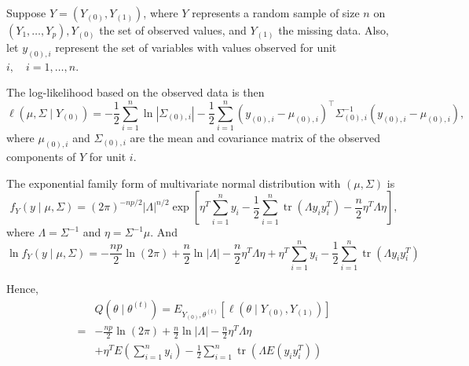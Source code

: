 \begin{example}
	Suppose $Y=\left(Y_{(0)}, Y_{(1)}\right)$, where $Y$ represents a random sample of size $n$ on $\left(Y_{1}, \ldots, Y_{p}\right), Y_{(0)}$ the set of observed values, and $Y_{(1)}$ the missing data. Also, let $y_{(0), i}$ represent the set of variables with values observed for unit $i, \quad i=1, \ldots, n$.

	The log-likelihood based on the observed data is then
	\begin{equation}
		\ell\left(\mu, \Sigma \mid Y_{(0)}\right)=-\frac{1}{2} \sum_{i=1}^{n} \ln \left|\Sigma_{(0), i}\right|-\frac{1}{2} \sum_{i=1}^{n}\left(y_{(0), i}-\mu_{(0), i}\right)^{\top} \Sigma_{(0), i}^{-1}\left(y_{(0), i}-\mu_{(0), i}\right),
	\end{equation}
	where $\mu_{(0), i}$ and $\Sigma_{(0), i}$ are the mean and covariance matrix of the observed components of $Y$ for unit $i$.

	The exponential family form of multivariate normal distribution with $\left(\mu,\Sigma\right)$ is
	\begin{equation}
		f_{Y}(y\mid\mu,\Sigma)=(2\pi)^{-np/2}|\Lambda|^{n/2}\exp\left[\eta^{T}\sum_{i=1}^{n}y_{i}-\frac{1}{2}\sum_{i=1}^{n}\operatorname{tr}\left(\Lambda y_{i}y_{i}^{T}\right)-\frac{n}{2}\eta^{T}\Lambda\eta\right],
	\end{equation}
	where $\Lambda=\Sigma^{-1}$ and $\eta=\Sigma^{-1}\mu$. And
	\begin{equation}
		\ln f_{Y}(y\mid\mu,\Sigma)=-\frac{np}{2}\ln(2\pi)+\frac{n}{2}\ln|\Lambda|-\frac{n}{2}\eta^{T}\Lambda\eta+\eta^{T}\sum_{i=1}^{n}y_{i}-\frac{1}{2}\sum_{i=1}^{n}\operatorname{tr}\left(\Lambda y_{i}y_{i}^{T}\right)
	\end{equation}

	Hence,
	\begin{equation}
		\begin{aligned}
			  & Q\left(\theta\mid\theta^{(t)}\right)=E_{Y_{(0)},\theta^{(t)}}\left[\ell\left(\theta\mid Y_{(0)},Y_{(1)}\right)\right]                  \\
			= & -\frac{np}{2}\ln(2\pi)+\frac{n}{2}\ln|\Lambda|-\frac{n}{2}\eta^{T}\Lambda\eta                                                          \\
			  & +\eta^{T}E\left(\sum_{i=1}^{n}y_{i}\right)-\frac{1}{2}\sum_{i=1}^{n}\operatorname{tr}\left(\Lambda E\left(y_{i}y_{i}^{T}\right)\right)
		\end{aligned}
	\end{equation}


\end{example}
